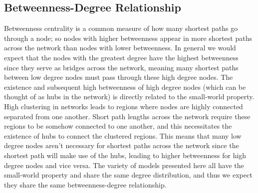 \documentclass[aps,pre,reprint,superscriptaddress,amsmath,amssymb]{revtex4-1}
\begin{document}

\subsection{Betweenness-Degree Relationship}	%
Betweenness centrality is a common measure of how many shortest paths go through a node; so nodes with higher betweenness appear in more shortest paths across the network than nodes with lower betweenness.
In general we would expect that the nodes with the greatest degree have the highest betweenness since they serve as bridges across the network, meaning many shortest paths between low degree nodes must pass through these high degree nodes.
The existence and subsequent high betweenness of high degree nodes (which can be thought of as hubs in the network) is directly related to the small-world property.
High clustering in networks leads to regions where nodes are highly connected separated from one another.
Short path lengths across the network require these regions to be somehow connected to one another, and this necessitates the existence of hubs to connect the clustered regions.
This means that many low degree nodes aren't necessary for shortest paths across the network since the shortest path will make use of the hubs, leading to higher betweenness for high degree nodes and vice versa.
The variety of models presented here all have the small-world property and share the same degree distribution, and thus we expect they share the same betweenness-degree relationship.

\end{document}
